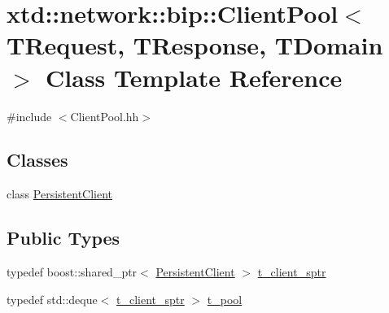 \hypertarget{classxtd_1_1network_1_1bip_1_1ClientPool}{}\section{xtd\+:\+:network\+:\+:bip\+:\+:Client\+Pool$<$ T\+Request, T\+Response, T\+Domain $>$ Class Template Reference}
\label{classxtd_1_1network_1_1bip_1_1ClientPool}


{\ttfamily \#include $<$Client\+Pool.\+hh$>$}

\subsection*{Classes}
\begin{DoxyCompactItemize}
\item 
class \hyperlink{classxtd_1_1network_1_1bip_1_1ClientPool_1_1PersistentClient}{Persistent\+Client}
\end{DoxyCompactItemize}
\subsection*{Public Types}
\begin{DoxyCompactItemize}
\item 
typedef boost\+::shared\+\_\+ptr$<$ \hyperlink{classxtd_1_1network_1_1bip_1_1ClientPool_1_1PersistentClient}{Persistent\+Client} $>$ \hyperlink{classxtd_1_1network_1_1bip_1_1ClientPool_ac3b215a76aeb124011801824f993a52b}{t\+\_\+client\+\_\+sptr}
\item 
typedef std\+::deque$<$ \hyperlink{classxtd_1_1network_1_1bip_1_1ClientPool_ac3b215a76aeb124011801824f993a52b}{t\+\_\+client\+\_\+sptr} $>$ \hyperlink{classxtd_1_1network_1_1bip_1_1ClientPool_ab0b045804570a41e6e491a715d56a469}{t\+\_\+pool}
\end{DoxyCompactItemize}
